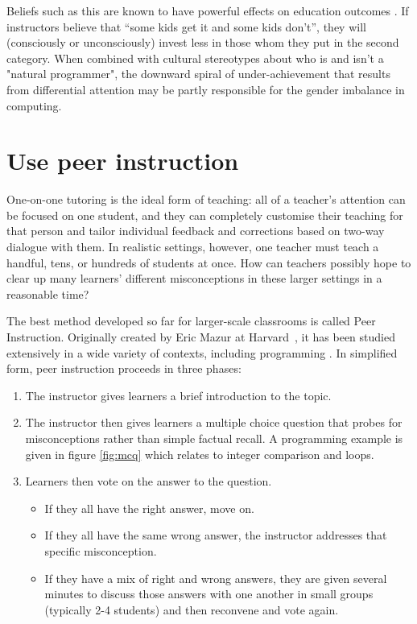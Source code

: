 \documentclass{article}
\begin{document}
Beliefs such as this are known to have powerful effects on education outcomes
\citep{alvidrez-weinstein,brophy,jussim-eccles}.
If instructors believe that ``some kids get it and some kids don't'',
they will (consciously or unconsciously) invest less in those whom they put in the second category.
When combined with cultural stereotypes about who is and isn't a "natural programmer",
the downward spiral of under-achievement that results from differential attention
may be partly responsible for the gender imbalance in computing.

\section{Use peer instruction}\label{peer-instruction}

One-on-one tutoring is the ideal form of teaching:
all of a teacher's attention can be focused on one student,
and they can completely customise their teaching for that person
and tailor individual feedback and corrections based on two-way dialogue with them.
In realistic settings,
however,
one teacher must teach a handful, tens, or hundreds of students at once.
How can teachers possibly hope to clear up many learners' different misconceptions
in these larger settings in a reasonable time?

The best method developed so far for larger-scale classrooms is called Peer Instruction.
Originally created by Eric Mazur at Harvard~\citep{mazur-peer-instruction},
it has been studied extensively in a wide variety of contexts,
including programming \citep{cutts,porter}.
In simplified form,
peer instruction proceeds in three phases:

\begin{enumerate}

\item The instructor gives learners a brief introduction to the topic.

\item The instructor then gives learners a multiple choice question
  that probes for misconceptions rather than simple factual recall.
  A programming example is given in figure \ref{fig:mcq}
  which relates to integer comparison and loops.

\item Learners then vote on the answer to the question.

  \begin{itemize}
  \item If they all have the right answer, move on.
  \item If they all have the same wrong answer,
    the instructor addresses that specific misconception.
  \item If they have a mix of right and wrong answers,
    they are given several minutes to discuss those answers with one another
    in small groups (typically 2-4 students)
    and then reconvene and vote again.
  \end{itemize}

\end{enumerate}
\end{document}
